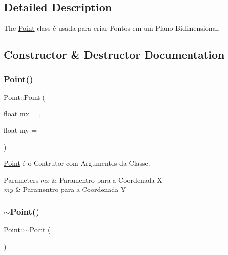 \subsection{Detailed Description}
The \mbox{\hyperlink{class_point}{Point}} class é usada para criar Pontos em um Plano Bidimensional. 

\subsection{Constructor \& Destructor Documentation}
\mbox{\label{class_point_a2e9cc55fe05ce04457997f4f19aaa28d}} 
\subsubsection{\texorpdfstring{Point()}{Point()}\hspace{0.1cm}{\footnotesize\ttfamily [1/2]}}
{\footnotesize\ttfamily Point\+::\+Point (\begin{DoxyParamCaption}\item[{float}]{mx = {},  }\item[{float}]{my = {} }\end{DoxyParamCaption})}



\mbox{\hyperlink{class_point}{Point}} é o Contrutor com Argumentos da Classe. 


\begin{DoxyParams}{Parameters}
{\em mx} & Paramentro para a Coordenada X \\
\hline
{\em my} & Paramentro para a Coordenada Y \\
\hline
\end{DoxyParams}
\mbox{\label{class_point_a395fa04b4ec126b66fc053f829a30cc1}} 
\subsubsection{\texorpdfstring{$\sim$\+Point()}{~Point()}}
{\footnotesize\ttfamily Point\+::$\sim$\+Point (\begin{DoxyParamCaption}{ }\end{DoxyParamCaption})}

\mbox{\label{class_point_af0c0f20db1616447bc78184ed537ef6e}} 
